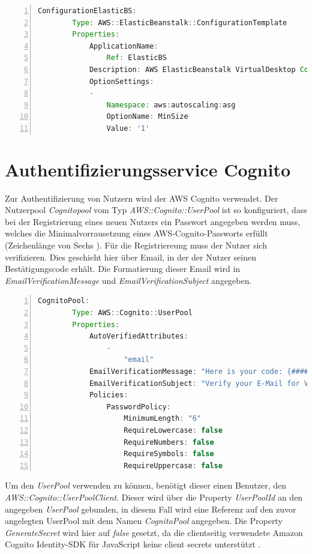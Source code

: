 \documentclass[a4paper, 12pt]{scrreprt}
\renewcommand\_{\textunderscore\allowbreak}
\begin{document}
\begin{lstlisting}[xleftmargin=\parindent,numbers=left,numberstyle=\small,numbersep=8pt,frame=L,mathescape=true, basicstyle=\small, language=Java, lineskip={1.0pt}]
ConfigurationElasticBS:
        Type: AWS::ElasticBeanstalk::ConfigurationTemplate
        Properties:
            ApplicationName:
                Ref: ElasticBS
            Description: AWS ElasticBeanstalk VirtualDesktop Configuration
            OptionSettings:
            -
                Namespace: aws:autoscaling:asg
                OptionName: MinSize
                Value: '1'
\end{lstlisting}

\section{Authentifizierungsservice Cognito}
Zur Authentifizierung von Nutzern wird der AWS Cognito verwendet. Der Nutzerpool \textit{Cognitopool} vom Typ \textit{AWS::Cognito::UserPool} ist so konfiguriert, dass bei der Registrierung eines neuen Nutzers ein Passwort angegeben werden muss, welches die Minimalvorrausetzung eines AWS-Cognito-Passworts erfüllt (Zeichenlänge von Sechs \cite{AWSD}). Für die Registriereung muss der Nutzer sich verifizieren. Dies geschieht hier über Email, in der der Nutzer seinen Bestätigungscode erhält. Die Formatierung dieser Email wird in \textit{EmailVerificationMessage} und \textit{EmailVerificationSubject} angegeben.  
\begin{lstlisting}[xleftmargin=\parindent,numbers=left,numberstyle=\small,numbersep=8pt,frame=L,mathescape=true, basicstyle=\small, language=Java, lineskip={1.0pt}]
CognitoPool:
        Type: AWS::Cognito::UserPool
        Properties:
            AutoVerifiedAttributes:
                -
                    "email"
            EmailVerificationMessage: "Here is your code: {####}"
            EmailVerificationSubject: "Verify your E-Mail for VD"
            Policies:
                PasswordPolicy:
                    MinimumLength: "6"
                    RequireLowercase: false
                    RequireNumbers: false
                    RequireSymbols: false
                    RequireUppercase: false

\end{lstlisting}
\bigskip
\noindent Um den \textit{UserPool} verwenden zu können, benötigt dieser einen Benutzer, den \textit{AWS::Cognito::UserPoolClient}. Dieser wird über die Property \textit{UserPoolId} an den angegeben \textit{UserPool} gebunden, in diesem Fall wird eine Referenz auf den zuvor angelegten UserPool mit dem Namen \textit{CognitoPool} angegeben. Die Property \textit{GenerateSecret} wird hier auf \textit{false} gesetzt, da die clientseitig verwendete Amazon Cognito Identity-SDK für JavaScript keine client secrets unterstützt \cite{AWSAmplify}.
\end{document}
